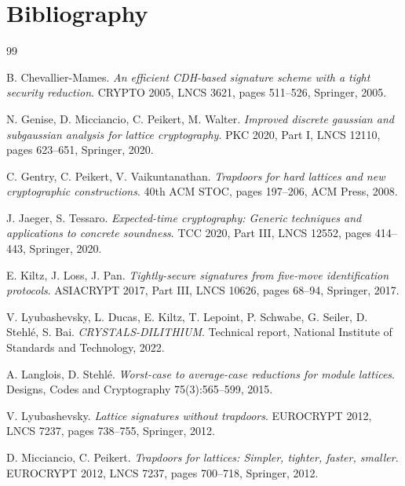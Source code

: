 \documentclass{aicr-conjecture}
\begin{document}
\section{Bibliography}

\begin{aicrbibliography}{99}

B. Chevallier-Mames.
\emph{An efficient CDH-based signature scheme with a tight security
reduction}.
CRYPTO 2005, LNCS 3621, pages 511--526, Springer, 2005.

N. Genise, D. Micciancio, C. Peikert, M. Walter.
\emph{Improved discrete gaussian and subgaussian analysis for lattice
cryptography}.
PKC 2020, Part I, LNCS 12110, pages 623--651, Springer, 2020.

C. Gentry, C. Peikert, V. Vaikuntanathan.
\emph{Trapdoors for hard lattices and new cryptographic constructions}.
40th ACM STOC, pages 197--206, ACM Press, 2008.

J. Jaeger, S. Tessaro.
\emph{Expected-time cryptography: Generic techniques and applications
to concrete soundness}.
TCC 2020, Part III, LNCS 12552, pages 414--443, Springer, 2020.

E. Kiltz, J. Loss, J. Pan.
\emph{Tightly-secure signatures from five-move identification
protocols}.
ASIACRYPT 2017, Part III, LNCS 10626, pages 68--94, Springer, 2017.

V. Lyubashevsky, L. Ducas, E. Kiltz, T. Lepoint, P. Schwabe,
G. Seiler, D. Stehl\'e, S. Bai.
\emph{CRYSTALS-DILITHIUM}.
Technical report, National Institute of Standards and Technology, 2022.

A. Langlois, D. Stehl\'e.
\emph{Worst-case to average-case reductions for module lattices}.
Designs, Codes and Cryptography 75(3):565--599, 2015.

V. Lyubashevsky.
\emph{Lattice signatures without trapdoors}.
EUROCRYPT 2012, LNCS 7237, pages 738--755, Springer, 2012.

D. Micciancio, C. Peikert.
\emph{Trapdoors for lattices: Simpler, tighter, faster, smaller}.
EUROCRYPT 2012, LNCS 7237, pages 700--718, Springer, 2012.

\end{aicrbibliography}
\end{document}

